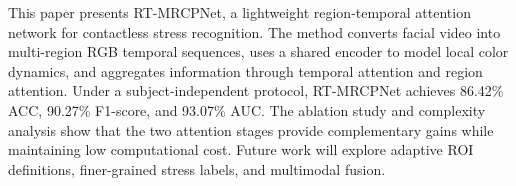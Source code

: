\documentclass[runningheads]{llncs}
\begin{document}
This paper presents RT-MRCPNet, a lightweight region-temporal attention network for contactless stress recognition. The method converts facial video into multi-region RGB temporal sequences, uses a shared encoder to model local color dynamics, and aggregates information through temporal attention and region attention. Under a subject-independent protocol, RT-MRCPNet achieves 86.42\% ACC, 90.27\% F1-score, and 93.07\% AUC. The ablation study and complexity analysis show that the two attention stages provide complementary gains while maintaining low computational cost. Future work will explore adaptive ROI definitions, finer-grained stress labels, and multimodal fusion.

\begingroup


\endgroup
\end{document}
